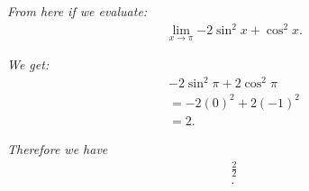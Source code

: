 \documentclass{report}
\begin{document}
\begin{mdframed}
      \bigbreak \noindent 
      \textit{From here if we evaluate:}
      \begin{align*}
        \lim_{x \to \pi}{-2\sin^{2}{x}+\cos^{2}{x}}
      .\end{align*}

      \bigbreak \noindent 
      \textit{We get:}
      \begin{align*}
        -2\sin^{2}{\pi} + 2\cos^{2}{\pi} \\
        = -2(0)^{2} + 2(-1)^{2} \\
        = 2
      .\end{align*}

      \bigbreak \noindent 
      \textit{Therefore we have}
      \begin{align*}
        \frac{2}{2} \\
      .\end{align*}
      \begin{center}
        \begin{Large}
        \end{Large}
      \end{center}
    \end{mdframed}
\end{document}
